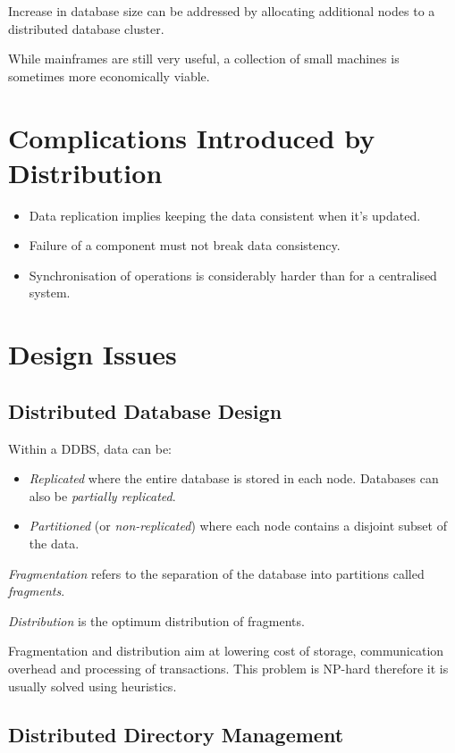 \documentclass[12pt]{article}
\begin{document}
Increase in database size can be addressed by allocating additional
 nodes to a distributed database cluster.

While mainframes are still very useful, a collection of small machines is sometimes more economically viable. 

\section{Complications Introduced by Distribution}

\begin{itemize}
	\item Data replication implies keeping the data consistent when it's updated.
	\item Failure of a component must not break data consistency.
	\item Synchronisation of operations is considerably harder than for a centralised system.
\end{itemize}

\section{Design Issues}

\subsection{Distributed Database Design}

Within a DDBS, data can be:
\begin{itemize}
	\item \textit{Replicated} where the entire database is stored in each node. Databases can also be \textit{partially replicated}.
	\item \textit{Partitioned} (or \textit{non-replicated}) where each node contains a disjoint subset of the data.
\end{itemize}

\textit{Fragmentation} refers to the separation of the database into partitions called \textit{fragments}.

\textit{Distribution} is the optimum distribution of fragments.

Fragmentation and distribution aim at lowering cost of storage, communication overhead and processing of transactions. This problem is NP-hard therefore it is usually solved using heuristics.

\subsection{Distributed Directory Management}
\end{document}
